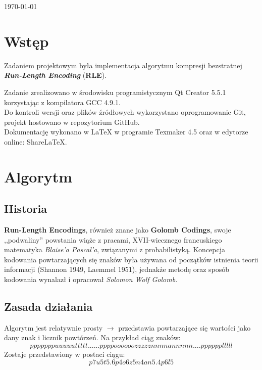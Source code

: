 \documentclass[12pt,a4paper,notitlepage]{report}
\makeatletter
\newcommand*{\toccontents}{\@starttoc{toc}}
\makeatother
\begin{document}
\begin{titlepage}
\begin{center}
\vspace{2cm}
{\large \today}

\end{center}
\end{titlepage}

\toccontents

\section{Wstęp}
Zadaniem projektowym była implementacja algorytmu kompresji bezstratnej \newline \emph{\textbf{Run-Length Encoding}} (\textbf{RLE}).

Zadanie zrealizowano w środowisku programistycznym Qt Creator 5.5.1\cite{qt} korzystając z kompilatora GCC 4.9.1\cite{gcc}.\\
Do kontroli wersji oraz plików źródłowych wykorzystano oprogramowanie Git\cite{git}, projekt hostowano w repozytorium GitHub\cite{github}.\\
Dokumentację wykonano w \LaTeX \cite{latex} w programie Texmaker 4.5 \cite{program} oraz w edytorze online: ShareLaTeX\cite{sharelatex}. 

\section{Algorytm}
\subsection{Historia}
\textbf{Run-Length Encodings}, również znane jako \textbf{Golomb Codings}, swoje ,,podwaliny'' powstania wiąże z pracami, XVII-wiecznego francuskiego matematyka \textit{Blaise'a Pascal'a}, związanymi z probabilistyką\cite{book}. Koncepcja kodowania powtarzających się znaków była używana od początków istnienia teorii informacji (Shannon 1949, Laemmel 1951), jednakże metodę oraz sposób kodowania wynalazł i opracował \textit{Solomon Wolf Golomb}\cite{golomb}\cite{book}.

\subsection{Zasada działania}
Algorytm jest relatywnie prosty $\rightarrow$ przedstawia powtarzające się wartości jako dany znak i licznik powtórzeń. Na przykład ciąg znaków:
\[pppppppuuuuuttttt......ppppoooooozzzzznnnnannnnn....pppppplllll\]
Zostaje przedstawiony w postaci ciągu:
\[p7u5t5.6p4o6z5n4an5.4p6l5\]
\end{document}
